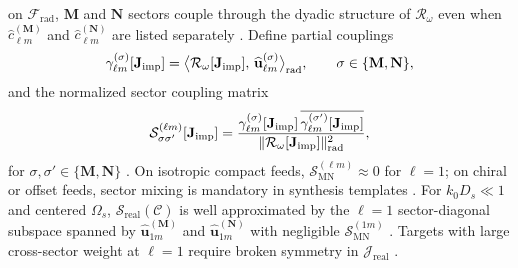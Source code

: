 on \(\mathcal{F}_{\mathrm{rad}}\), \(\mathbf{M}\) and \(\mathbf{N}\) sectors couple through the dyadic structure of
\(\mathcal{R}_\omega\) even when \(\widehat{c}_{\ell m}^{(\mathbf{M})}\) and \(\widehat{c}_{\ell m}^{(\mathbf{N})}\) are
listed separately \cite{stratton1941}. Define partial couplings
\begin{equation}
\label{eq:ch4.sector-partial-coupling}
\gamma_{\ell m}^{(\sigma)}[\mathbf{J}_{\mathrm{imp}}]
=
\big\langle
\mathcal{R}_\omega[\mathbf{J}_{\mathrm{imp}}],\,
\widehat{\mathbf{u}}_{\ell m}^{(\sigma)}
\big\rangle_{\mathrm{rad}},
\qquad
\sigma\in\{\mathbf{M},\mathbf{N}\},
\end{equation}
and the normalized sector coupling matrix
\begin{equation}
\label{eq:ch4.sector-coupling-matrix}
\mathcal{S}_{\sigma\sigma'}^{(\ell m)}[\mathbf{J}_{\mathrm{imp}}]
=
\frac{
\gamma_{\ell m}^{(\sigma)}[\mathbf{J}_{\mathrm{imp}}]\,
\overline{\gamma_{\ell m}^{(\sigma')}[\mathbf{J}_{\mathrm{imp}}]}
}{
\|\mathcal{R}_\omega[\mathbf{J}_{\mathrm{imp}}]\|_{\mathrm{rad}}^{2}
},
\end{equation}
for \(\sigma,\sigma'\in\{\mathbf{M},\mathbf{N}\}\) \cite{hansen1988}. On isotropic compact feeds,
\(\mathcal{S}_{\mathrm{MN}}^{(\ell m)}\approx0\) for \(\ell=1\); on chiral or offset feeds, sector mixing is mandatory in
synthesis templates \cite{jackson1999}.
\label{cor:ch4.sector-diagonal-dominance}
For \(k_{0}D_{s}\ll1\) and centered \(\Omega_{s}\), \(\mathcal{S}_{\mathrm{real}}(\mathcal{C})\) is well approximated by
the \(\ell=1\) sector-diagonal subspace spanned by \(\widehat{\mathbf{u}}_{1m}^{(\mathbf{M})}\) and
\(\widehat{\mathbf{u}}_{1m}^{(\mathbf{N})}\) with negligible \(\mathcal{S}_{\mathrm{MN}}^{(1m)}\)
\cite{jackson1999}. Targets with large cross-sector weight at \(\ell=1\) require broken
symmetry in \(\mathcal{J}_{\mathrm{real}}\) \cite{harrington2001}.

